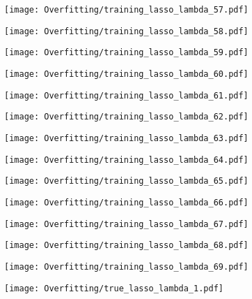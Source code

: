 \documentclass[xcolor=pdftex,dvipsnames,table]{beamer}
\begin{document}
\frame
{
	\begin{center}
		\texttt{[image: Overfitting/training\_lasso\_lambda\_57.pdf]}
	\end{center}
}
\frame
{
	\begin{center}
		\texttt{[image: Overfitting/training\_lasso\_lambda\_58.pdf]}
	\end{center}
}
\frame
{
	\begin{center}
		\texttt{[image: Overfitting/training\_lasso\_lambda\_59.pdf]}
	\end{center}
}
\frame
{
	\begin{center}
		\texttt{[image: Overfitting/training\_lasso\_lambda\_60.pdf]}
	\end{center}
}
\frame
{
	\begin{center}
		\texttt{[image: Overfitting/training\_lasso\_lambda\_61.pdf]}
	\end{center}
}
\frame
{
	\begin{center}
		\texttt{[image: Overfitting/training\_lasso\_lambda\_62.pdf]}
	\end{center}
}
\frame
{
	\begin{center}
		\texttt{[image: Overfitting/training\_lasso\_lambda\_63.pdf]}
	\end{center}
}
\frame
{
	\begin{center}
		\texttt{[image: Overfitting/training\_lasso\_lambda\_64.pdf]}
	\end{center}
}
\frame
{
	\begin{center}
		\texttt{[image: Overfitting/training\_lasso\_lambda\_65.pdf]}
	\end{center}
}
\frame
{
	\begin{center}
		\texttt{[image: Overfitting/training\_lasso\_lambda\_66.pdf]}
	\end{center}
}
\frame
{
	\begin{center}
		\texttt{[image: Overfitting/training\_lasso\_lambda\_67.pdf]}
	\end{center}
}
\frame
{
	\begin{center}
		\texttt{[image: Overfitting/training\_lasso\_lambda\_68.pdf]}
	\end{center}
}
\frame
{
	\begin{center}
		\texttt{[image: Overfitting/training\_lasso\_lambda\_69.pdf]}
	\end{center}
}
\frame
{
	\begin{center}
		\texttt{[image: Overfitting/true\_lasso\_lambda\_1.pdf]}
	\end{center}
}
\end{document}
